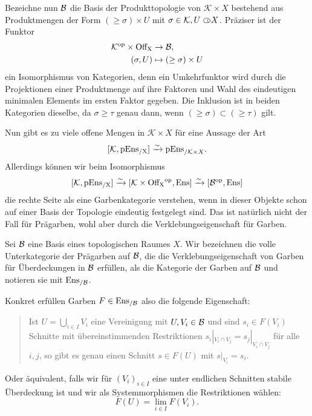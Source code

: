 Bezeichne nun $\mathcal{B}$ die Basis der Produkttopologie von
$\mathcal{K} \times X$ bestehend aus Produktmengen der Form $(\geq
\sigma) \times U$ mit $\sigma \in \mathcal{K}, U \subset\kern-0.58em\circ X$. Präziser
ist der Funktor
\begin{align*}
  \mathcal{K}^\mathrm{op} \times \operatorname{Off_X} &\to \mathcal{B}, \\
  (\sigma, U) &\mapsto (\geq \sigma) \times U
\end{align*}
ein Isomorphismus von Kategorien, denn ein Umkehrfunktor wird durch
die Projektionen einer Produktmenge auf ihre Faktoren und Wahl des
eindeutigen minimalen Elements im ersten Faktor gegeben. Die Inklusion
ist in beiden Kategorien dieselbe, da $\sigma \geq \tau$ genau dann,
wenn $(\geq \sigma) \subset (\geq \tau)$ gilt.

Nun gibt es zu viele offene Mengen in $\mathcal{K} \times X$ für eine
Aussage der Art
\[
  [\mathcal{K}, \operatorname{pEns_{/X}}] \xrightarrow[]{\sim} \mathrm{pEns}_{/\mathcal{K} \times X}.
\]
Allerdings können wir beim Isomorphismus
\[
  [\mathcal{K}, \operatorname{pEns_{/X}}]
  \xrightarrow[]{\sim} {[\mathcal{K} \times \operatorname{Off_X}^\mathrm{op}, \operatorname{Ens}]}
  \xrightarrow[]{\sim} {[\mathcal{B}^\mathrm{op}, \operatorname{Ens}]}
\]
die rechte Seite als eine Garbenkategorie verstehen, wenn in dieser
Objekte schon auf einer Basis der Topologie eindeutig festgelegt
sind. Das ist natürlich nicht der Fall für Prägarben, wohl aber durch
die Verklebungseigenschaft für Garben.
\begin{defn}
  Sei $\mathcal{B}$ eine Basis eines topologischen Raumes $X$.  Wir
  bezeichnen die volle Unterkategorie der Prägarben auf $\mathcal{B}$,
  die die Verklebungseigenschaft von Garben für Überdeckungen in
  $\mathcal{B}$ erfüllen, als die Kategorie der Garben auf
  $\mathcal{B}$ und notieren sie mit $\operatorname{Ens_{/\mathcal{B}}}$.
\end{defn}

Konkret erfüllen Garben $F \in \operatorname{Ens_{/\mathcal{B}}}$ also die folgende
Eigenschaft:
\begin{quote}
  Ist $U = \bigcup_{i \in I} V_i$ eine Vereinigung mit $U, V_i \in
  \mathcal{B}$ und sind $s_i \in F(V_i)$ Schnitte mit
  übereinstimmenden Restriktionen $s_i |_{V_i \cap V_j} = s_j |_{V_i
    \cap V_j}$ für alle $i, j$, so gibt es genau einen Schnitt $s \in
  F(U)$ mit $s |_{V_i} = s_i$.
\end{quote}
Oder äquivalent, falls wir für $(V_i)_{i \in I}$ eine unter endlichen
Schnitten stabile Überdeckung ist und wir als Systemmorphismen die
Restriktionen wählen:
\[ F(U) = \lim_{i \in I} F(V_i) . \]


